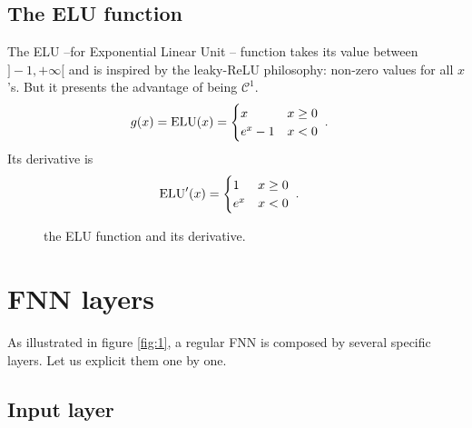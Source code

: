 \subsection{The ELU function}

The ELU --for Exponential Linear Unit -- function takes its value between $]-1,+\infty[$ and is inspired by the leaky-ReLU philosophy: non-zero values for all $x$'s. But it presents the advantage of being $\mathcal{C}^1$.
\begin{align}
g(x)&={\rm ELU}(x)=\begin{cases}
      x & x\geq 0 \\
      e^x-1 & x<0
   \end{cases}\;.
\end{align}
Its derivative is
\begin{align}
{\rm ELU}'(x)&=\begin{cases}
      1 & x\geq 0 \\
      e^x & x<0
   \end{cases}\;.
\end{align}


\begin{figure}[H]
\begin{center}
\end{center}
\caption{\label{fig:elu} the ELU function and its derivative.}
\end{figure}



\section{FNN layers}

As illustrated in figure \ref{fig:1}, a regular FNN is composed by several specific layers. Let us explicit them one by one.



\subsection{Input layer}

